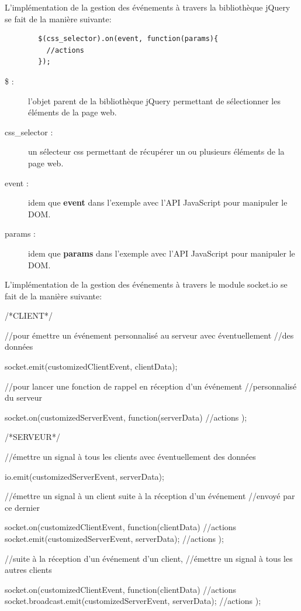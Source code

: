 \documentclass[12pt]{report}
\begin{document}
	L'implémentation de la gestion des événements à travers la bibliothèque jQuery se fait de la manière suivante:

	\begin{verbatim}
		$(css_selector).on(event, function(params){
		  //actions
		});
	\end{verbatim}

	\begin{description}
		\item[\$ :]{
			l'objet parent de la bibliothèque jQuery permettant de sélectionner les éléments de la page web.
		}
		\item[css\_selector :]{
			un sélecteur css permettant de récupérer un ou plusieurs éléments de la page web.
		}
		\item[event :]{
			idem que \textbf{event} dans l'exemple avec l'API JavaScript pour manipuler le DOM.
		}
		\item[params :]{
			idem que \textbf{params} dans l'exemple avec l'API JavaScript pour manipuler le DOM.
		}
	\end{description}

	L'implémentation de la gestion des événements à travers le module socket.io se fait de la manière suivante:

	\begin{verbatimtab}[4]
	/*CLIENT*/

	//pour émettre un événement personnalisé au serveur avec éventuellement
	//des données

	socket.emit(customizedClientEvent, clientData);

	//pour lancer une fonction de rappel en réception d'un événement
	//personnalisé du serveur

	socket.on(customizedServerEvent, function(serverData){
		//actions
	});

	/*SERVEUR*/

	//émettre un signal à tous les clients avec éventuellement des données

	io.emit(customizedServerEvent, serverData);

	//émettre un signal à un client suite à la réception d'un événement
	//envoyé par ce dernier

	socket.on(customizedClientEvent, function(clientData){
		//actions
		socket.emit(customizedServerEvent, serverData);
		//actions
	});

	//suite à la réception d'un événement d'un client,
	//émettre un signal à tous les autres clients

	socket.on(customizedClientEvent, function(clientData){
		//actions
		socket.broadcast.emit(customizedServerEvent, serverData);
		//actions
	});
	\end{verbatimtab}
\end{document}
